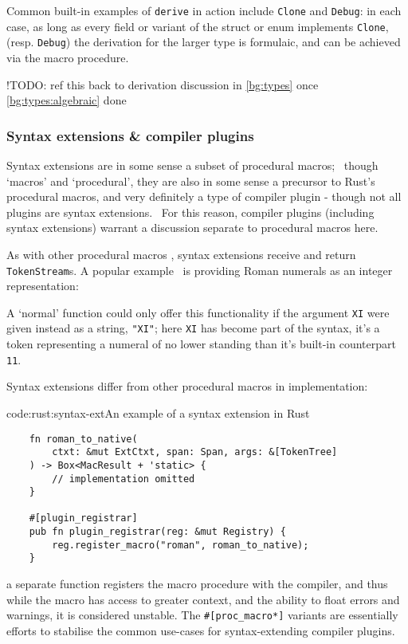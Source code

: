 Common built-in examples of \texttt{derive} in action include \texttt{Clone} and \texttt{Debug}: in each case, as long as every field or variant of the struct or enum implements \texttt{Clone}, (resp. \texttt{Debug}) the derivation for the larger type is formulaic, and can be achieved via the macro procedure.

!TODO: ref this back to derivation discussion in \cref{bg:types} once \cref{bg:types:algebraic} done

\subsubsection{Syntax extensions \& compiler plugins} \label{bg:rust:plugins}

Syntax extensions are in some sense a subset of procedural macros;~ \cite{rust_macros_whereweat} though `macros' and `procedural', they are also in some sense a precursor to Rust's procedural macros, and very definitely a type of compiler plugin - though not all plugins are syntax extensions.~\cite{rust_macros_overview} For this reason, compiler plugins (including syntax extensions) warrant a discussion separate to procedural macros here.

As with other procedural macros , syntax extensions receive and return \texttt{TokenStream}s. A popular example~\cite{rust_macros_overview, rust_book} is providing Roman numerals as an integer representation: 

A `normal' function could only offer this functionality if the argument \texttt{XI} were given instead as a string, \texttt{"XI"}; here \texttt{XI} has become part of the syntax, it's a token representing a numeral of no lower standing than it's built-in counterpart \texttt{11}.

Syntax extensions differ from other procedural macros in implementation: 
\begin{codelisting}{code:rust:syntax-ext}{An example of a syntax extension in Rust}
\begin{verbatim}
    fn roman_to_native(
        ctxt: &mut ExtCtxt, span: Span, args: &[TokenTree]
    ) -> Box<MacResult + 'static> {
        // implementation omitted
    }

    #[plugin_registrar]
    pub fn plugin_registrar(reg: &mut Registry) {
        reg.register_macro("roman", roman_to_native);
    }
\end{verbatim}
\end{codelisting} a separate function registers the macro procedure with the compiler, and thus while the macro has access to greater context, and the ability to float errors and warnings, it is considered unstable. The \texttt{#[proc_macro*]} variants are essentially efforts to stabilise the common use-cases for syntax-extending compiler plugins. \cite{rust_macros_overview, rust_book}

